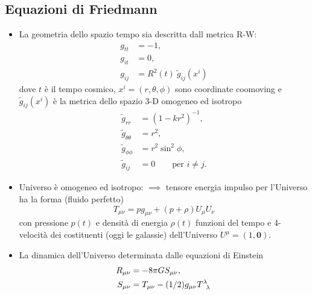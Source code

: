 \chapter{}
\label{cha:cosmologia}

\section{Equazioni di Friedmann}

\begin{itemize}
\item La geometria dello spazio tempo sia descritta dall metrica R-W:
  \begin{subequations}
    \begin{align}
      \label{rw1}
      g_{tt} &= -1, \\
      g_{it} &= 0, \\
      g_{ij} &= R^2(t) ~ \tilde{g}_{ij}(x^i)
    \end{align}
  \end{subequations}
  dove $t$ è il tempo cosmico, $x^{i} = (r,\theta,\phi)$ sono coordinate
  coomoving e $\tilde{g}_{ij}(x^i)$ è la metrica dello spazio 3-D omogeneo ed
  isotropo
  \begin{subequations}
    \begin{align}
      \label{rw2}
      \tilde{g}_{rr} &= (1-kr^2)^{-1}, \\
      \tilde{g}_{\theta \theta} & = r^2, \\
      \tilde{g}_{\phi \phi} &= r^2 \sin^2 \phi, \\
      \tilde{g}_{ij} &= 0 \qquad \text{per $i \ne j$}.
    \end{align}
  \end{subequations}
\item Universo è omogeneo ed isotropo: $\implies$ tensore energia impulso per
  l'Universo ha la forma (fluido perfetto)
  \begin{equation}
    T_{\mu\nu} = p g_{\mu\nu} + (p+\rho) U_{\mu} U_{\nu}
    \label{fp}
  \end{equation}
  con pressione $p(t)$ e densità di energia $\rho(t)$ funzioni del tempo e
  4-velocità dei costituenti (oggi le galassie) dell'Universo
  $U^{\mu}=(1,\bm{0})$.
\item La dinamica dell'Universo determinata dalle equazioni di Einstein
  \begin{subequations}
    \begin{align}
      \label{EE}
      R_{\mu\nu} &= -8 \pi G S_{\mu \nu}, \\
      S_{\mu \nu} &= T_{\mu \nu} - (1/2) g_{\mu \nu}
      \tensor{T}{^{\lambda}_{\lambda}}
    \end{align}
  \end{subequations}
\end{itemize}
